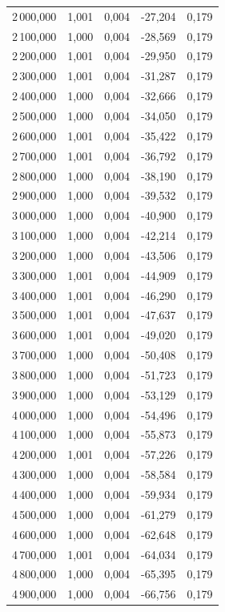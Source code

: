 \begin{longtable}{rrrrr}
2\,000,000 & 1,001 & 0,004 & -27,204 & 0,179\\
2\,100,000 & 1,000 & 0,004 & -28,569 & 0,179\\
2\,200,000 & 1,001 & 0,004 & -29,950 & 0,179\\
2\,300,000 & 1,001 & 0,004 & -31,287 & 0,179\\
2\,400,000 & 1,000 & 0,004 & -32,666 & 0,179\\
2\,500,000 & 1,000 & 0,004 & -34,050 & 0,179\\
2\,600,000 & 1,001 & 0,004 & -35,422 & 0,179\\
2\,700,000 & 1,001 & 0,004 & -36,792 & 0,179\\
2\,800,000 & 1,000 & 0,004 & -38,190 & 0,179\\
2\,900,000 & 1,000 & 0,004 & -39,532 & 0,179\\
3\,000,000 & 1,000 & 0,004 & -40,900 & 0,179\\
3\,100,000 & 1,000 & 0,004 & -42,214 & 0,179\\
3\,200,000 & 1,000 & 0,004 & -43,506 & 0,179\\
3\,300,000 & 1,001 & 0,004 & -44,909 & 0,179\\
3\,400,000 & 1,001 & 0,004 & -46,290 & 0,179\\
3\,500,000 & 1,001 & 0,004 & -47,637 & 0,179\\
3\,600,000 & 1,001 & 0,004 & -49,020 & 0,179\\
3\,700,000 & 1,000 & 0,004 & -50,408 & 0,179\\
3\,800,000 & 1,000 & 0,004 & -51,723 & 0,179\\
3\,900,000 & 1,000 & 0,004 & -53,129 & 0,179\\
4\,000,000 & 1,000 & 0,004 & -54,496 & 0,179\\
4\,100,000 & 1,000 & 0,004 & -55,873 & 0,179\\
4\,200,000 & 1,001 & 0,004 & -57,226 & 0,179\\
4\,300,000 & 1,000 & 0,004 & -58,584 & 0,179\\
4\,400,000 & 1,000 & 0,004 & -59,934 & 0,179\\
4\,500,000 & 1,000 & 0,004 & -61,279 & 0,179\\
4\,600,000 & 1,000 & 0,004 & -62,648 & 0,179\\
4\,700,000 & 1,001 & 0,004 & -64,034 & 0,179\\
4\,800,000 & 1,000 & 0,004 & -65,395 & 0,179\\
4\,900,000 & 1,000 & 0,004 & -66,756 & 0,179\\

\end{longtable}
